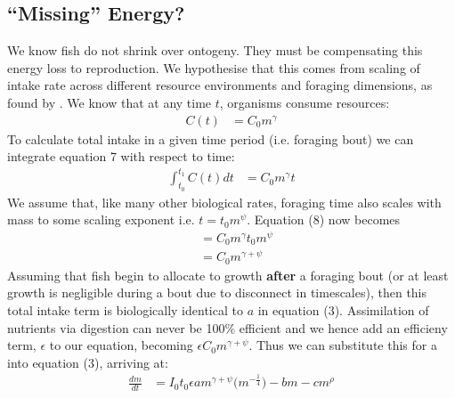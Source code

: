 \documentclass[a3paper]{article} %
\begin{document}
\begin{multicols}{2}
\section{``Missing'' Energy?}
We know fish do not shrink over ontogeny. They must be compensating this energy loss to reproduction. We hypothesise that this comes from scaling of intake rate across different resource environments and foraging dimensions, as found by \cite{Pawar2012}. We know that at any time $t$, organisms consume resources:
\begin{align}
    C(t) &= C_{0}m^{\gamma}
\end{align}
To calculate total intake in a given time period (i.e. foraging bout) we can integrate equation 7 with respect to time:
\begin{align}
    \int_{t_{0}}^{t_{1}}C(t)dt &= C_{0}m^{\gamma}t
\end{align}
We assume that, like many other biological rates, foraging time also scales with mass to some scaling exponent i.e. $t = t_{0}m^{\psi}$. Equation (8) now becomes
\begin{align}
    &= C_{0}m^{\gamma}t_{0}m^{\psi} \\
    &= C_{0}m^{\gamma + \psi}
\end{align}
Assuming that fish begin to allocate to growth \textbf{after} a foraging bout (or at least growth is negligible during a bout due to disconnect in timescales), then this total intake term is biologically identical to $a$ in equation (3). Assimilation of nutrients via digestion can never be 100\% efficient and we hence add an efficieny term, $\epsilon$ to our equation, becoming $\epsilon C_{0}m^{\gamma + \psi}$. Thus we can substitute this for a into equation (3), arriving at:
\begin{align}
    \frac{dm}{dt} &= I_{0}t_{0}\epsilon am^{\gamma + \psi}\Big(m^{-\frac{1}{4}}\Big) - bm - cm^{\rho}
\end{align}
\newpage




\end{multicols}
\end{document}
